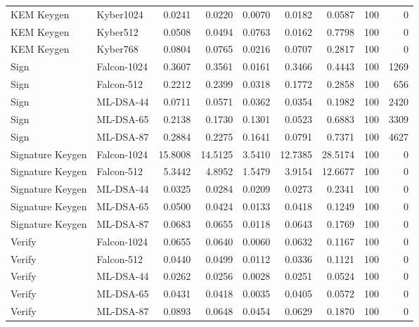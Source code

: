 \begin{longtable}{p{2.8cm}p{2.6cm}rrrrrrr}
KEM Keygen & Kyber1024 & 0.0241 & 0.0220 & 0.0070 & 0.0182 & 0.0587 & 100 & 0 \\
KEM Keygen & Kyber512 & 0.0508 & 0.0494 & 0.0763 & 0.0162 & 0.7798 & 100 & 0 \\
KEM Keygen & Kyber768 & 0.0804 & 0.0765 & 0.0216 & 0.0707 & 0.2817 & 100 & 0 \\
Sign & Falcon-1024 & 0.3607 & 0.3561 & 0.0161 & 0.3466 & 0.4443 & 100 & 1269 \\
Sign & Falcon-512 & 0.2212 & 0.2399 & 0.0318 & 0.1772 & 0.2858 & 100 & 656 \\
Sign & ML-DSA-44 & 0.0711 & 0.0571 & 0.0362 & 0.0354 & 0.1982 & 100 & 2420 \\
Sign & ML-DSA-65 & 0.2138 & 0.1730 & 0.1301 & 0.0523 & 0.6883 & 100 & 3309 \\
Sign & ML-DSA-87 & 0.2884 & 0.2275 & 0.1641 & 0.0791 & 0.7371 & 100 & 4627 \\
Signature Keygen & Falcon-1024 & 15.8008 & 14.5125 & 3.5410 & 12.7385 & 28.5174 & 100 & 0 \\
Signature Keygen & Falcon-512 & 5.3442 & 4.8952 & 1.5479 & 3.9154 & 12.6677 & 100 & 0 \\
Signature Keygen & ML-DSA-44 & 0.0325 & 0.0284 & 0.0209 & 0.0273 & 0.2341 & 100 & 0 \\
Signature Keygen & ML-DSA-65 & 0.0500 & 0.0424 & 0.0133 & 0.0418 & 0.1249 & 100 & 0 \\
Signature Keygen & ML-DSA-87 & 0.0683 & 0.0655 & 0.0118 & 0.0643 & 0.1769 & 100 & 0 \\
Verify & Falcon-1024 & 0.0655 & 0.0640 & 0.0060 & 0.0632 & 0.1167 & 100 & 0 \\
Verify & Falcon-512 & 0.0440 & 0.0499 & 0.0112 & 0.0336 & 0.1121 & 100 & 0 \\
Verify & ML-DSA-44 & 0.0262 & 0.0256 & 0.0028 & 0.0251 & 0.0524 & 100 & 0 \\
Verify & ML-DSA-65 & 0.0431 & 0.0418 & 0.0035 & 0.0405 & 0.0572 & 100 & 0 \\
Verify & ML-DSA-87 & 0.0893 & 0.0648 & 0.0454 & 0.0629 & 0.1870 & 100 & 0 \\
\end{longtable}
